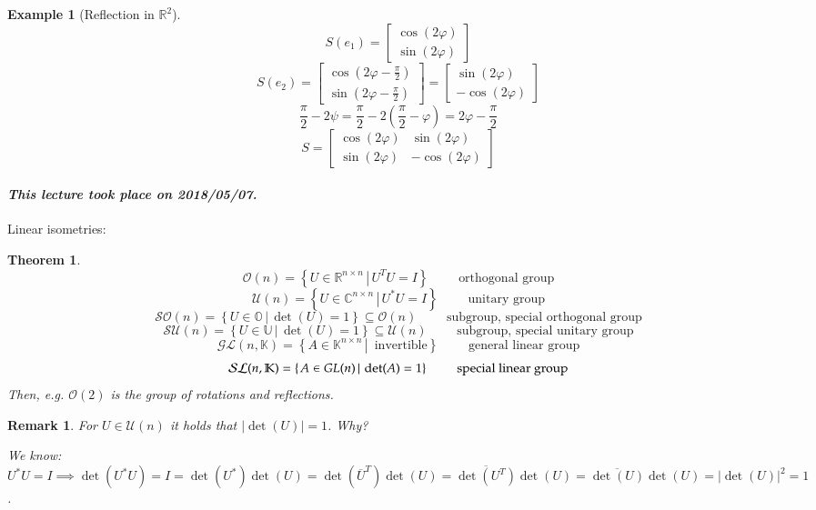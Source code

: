 \documentclass{article}
\newtheorem{theorem}{Theorem}  \numberwithin{theorem}{section}
\newtheorem{example}{Example}  \numberwithin{example}{section}
\newtheorem{remark}{Remark}  \numberwithin{remark}{section}
\newcommand{\setdef}[2]{\left\{\left.#1\,\right|\,#2\right\}}
\newcommand{\card}[1]{\left|#1\right|}
\newcommand{\dateref}[1]{\paragraph{\textit{This lecture took place on #1.}}}
\begin{document}
\begin{example}[Reflection in $\mathbb R^2$]
  \[ S(e_1) = \begin{bmatrix} \cos(2\varphi) \\ \sin(2\varphi) \end{bmatrix} \]
  \[ S(e_2) = \begin{bmatrix} \cos(2\varphi - \frac\pi2) \\ \sin(2\varphi - \frac\pi2) \end{bmatrix} = \begin{bmatrix} \sin(2\varphi) \\ -\cos(2\varphi) \end{bmatrix} \]
  \[ \frac\pi2 - 2\psi = \frac\pi2 - 2(\frac\pi2 - \varphi) = 2\varphi - \frac\pi2 \]
  \[ S = \begin{bmatrix} \cos(2\varphi) & \sin(2\varphi) \\ \sin(2\varphi) & -\cos(2\varphi) \end{bmatrix} \]
\end{example}

\dateref{2018/05/07}

Linear isometries:

\begin{theorem} %
  \[ \mathcal O(n) = \setdef{U \in \mathbb R^{n\times n}}{U^TU = I} \qquad \text{ orthogonal group} \]
  \[ \mathcal U(n) = \setdef{U \in \mathbb C^{n\times n}}{U^*U = I} \qquad \text{ unitary group} \]
  \[ \mathcal{SO}(n) = \setdef{U \in \mathbb O}{\det(U) = 1} \subseteq \mathcal O(n) \qquad \text{ subgroup, special orthogonal group} \]
  \[ \mathcal{SU}(n) = \setdef{U \in \mathbb U}{\det(U) = 1} \subseteq \mathcal U(n) \qquad \text{ subgroup, special unitary group} \]
  \[ \mathcal{GL}(n, \mathbb K) = \setdef{A \in \mathbb K^{n\times n}}{\text{ invertible}} \qquad \text{ general linear group} \]
  \[ \mathcal{SL}(n, \mathbb K) = \setdef{A \in \mathbb \mathcal{GL}(n)}{\det(A) = 1} \qquad \text{ special linear group} \]
  Then, e.g. $\mathcal O(2)$ is the group of rotations and reflections.
\end{theorem}

\begin{remark}
  For $U \in \mathcal U(n)$ it holds that $\card{\det(U)} = 1$. Why?

  We know: $U^* U = I \implies \det(U^* U) = I = \det(U^*) \det(U) = \det(\overline{U}^T) \det(U) = \overline{\det(U^T)} \det(U) = \overline{\det(U)} \det(U) = \card{\det(U)}^2 = 1$.
\end{remark}
\end{document}
